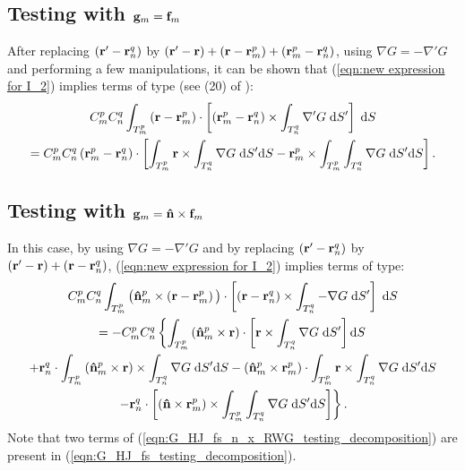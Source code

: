 \subsection{Testing with $\mathbf{g}_m = \mathbf{f}_m$}
%
\par
After replacing $\left(\mathbf{r}' - \mathbf{r}_n^q\right)$ by $\left(\mathbf{r}' - \mathbf{r}\right) + \left(\mathbf{r} - \mathbf{r}_m^p\right) + \left(\mathbf{r}_m^p - \mathbf{r}_n^q\right)$, using $\nabla G = -\nabla' G$ and performing a few manipulations, it can be shown that (\ref{eqn:new expression for I_2}) implies terms of type (see (20) of \cite{Taskinen_03}):
\begin{multline} \label{eqn:G_HJ_fs_testing_decomposition}
C_m^p C_n^q \int_{T_m^p} \left(\mathbf{r} - \mathbf{r}_m^p \right) \cdot \left[\left(\mathbf{r}_m^p - \mathbf{r}_n^q\right) \times \int_{T_n^q} \nabla' G \; \text{d} S'\right] \; \text{d} S \\
=C_m^p C_n^q \left(\mathbf{r}_m^p - \mathbf{r}_n^q\right) \cdot \left[\int_{T_m^p} \mathbf{r} \times \int_{T_n^q} \nabla G \; \text{d} S' \text{d} S - \mathbf{r}_m^p \times \int_{T_m^p} \int_{T_n^q}\nabla G \; \text{d} S' \text{d} S \right].
\end{multline}

\subsection{Testing with $\mathbf{g}_m = \mathbf{\Hat{n}} \times \mathbf{f}_m$}
%
\par
In this case, by using $\nabla G = -\nabla' G$ and by replacing $\left(\mathbf{r}'-\mathbf{r}_n^q \right)$ by $\left(\mathbf{r}'-\mathbf{r} \right) + \left(\mathbf{r}-\mathbf{r}_n^q \right)$, (\ref{eqn:new expression for I_2}) implies terms of type:
\begin{multline} \label{eqn:G_HJ_fs_n_x_RWG_testing_decomposition}
C_m^p C_n^q \int_{T_m^p} \big( \mathbf{\Hat{n}}_m^p \times \left(\mathbf{r} - \mathbf{r}_m^p \right) \big) \cdot \left[\left(\mathbf{r} - \mathbf{r}_n^q\right) \times \int_{T_n^q} -\nabla G \; \text{d} S'\right] \; \text{d} S \\
= -C_m^p C_n^q \left\{ \int_{T_m^p} \left(\mathbf{\Hat{n}}_m^p \times \mathbf{r}\right) \cdot \left[\mathbf{r} \times \int_{T_n^q} \nabla G \; \text{d} S' \right] \text{d} S \right. \\
+ \mathbf{r}_n^q \cdot \int_{T_m^p} \left(\mathbf{\Hat{n}}_m^p \times \mathbf{r}\right) \times \int_{T_n^q} \nabla G \; \text{d} S' \text{d} S  - \left(\mathbf{\Hat{n}}_m^p\times\mathbf{r}_m^p \right) \cdot \int_{T_m^p} \mathbf{r} \times \int_{T_n^q} \nabla G \; \text{d} S' \text{d} S \\
\left. - \mathbf{r}_n^q \cdot \left[\left(\mathbf{\Hat{n}} \times \mathbf{r}_m^p \right) \times \int_{T_m^p} \int_{T_n^q}\nabla G \; \text{d} S' \text{d} S\right]\right\}.
\end{multline}
Note that two terms of (\ref{eqn:G_HJ_fs_n_x_RWG_testing_decomposition}) are present in (\ref{eqn:G_HJ_fs_testing_decomposition}).

